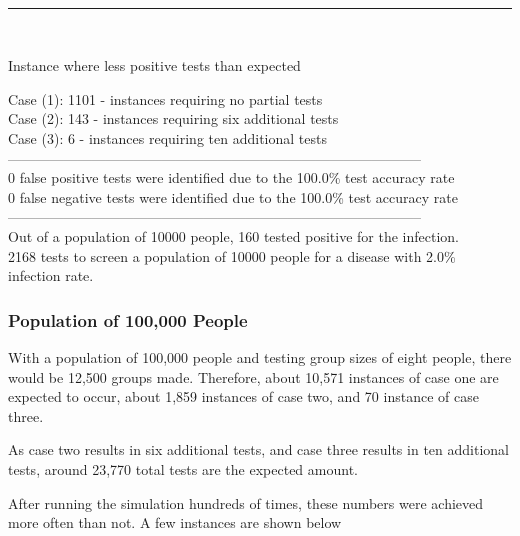 \documentclass[letterpaper, 10pt,DIV=13]{scrartcl}
\numberwithin{equation}{section} %
\numberwithin{figure}{section} %
\numberwithin{table}{section} %
\begin{document}
\\
\begin{center}
\rule{12cm}{.4pt}
\end{center}
\\
\begin{displayquote}
\begin{center}
    Instance where less positive tests than expected
\end{center}
Case (1): 1101 - instances requiring no partial tests\\
Case (2): 143 - instances requiring six additional tests\\
Case (3): 6 - instances requiring ten additional tests\\
-----------------------------------------------------------------------------------------\\
0 false positive tests were identified due to the 100.0\% test accuracy rate\\
0 false negative tests were identified due to the 100.0\% test accuracy rate\\
-----------------------------------------------------------------------------------------\\
Out of a population of 10000 people, 160 tested positive for the infection.\\
2168 tests to screen a population of 10000 people for a disease with 2.0\% infection rate.\\
\end{displayquote}





\subsubsection{Population of 100,000 People}

With a population of 100,000 people and testing group sizes of eight people, there would be 12,500 groups made.  Therefore, about 10,571 instances of case one are expected to occur, about 1,859 instances of case two, and 70 instance of case three.  

As case two results in six additional tests, and case three results in ten additional tests, around 23,770 total tests are the expected amount.

After running the simulation hundreds of times, these numbers were achieved more often than not.  A few instances are shown below
\end{document}
